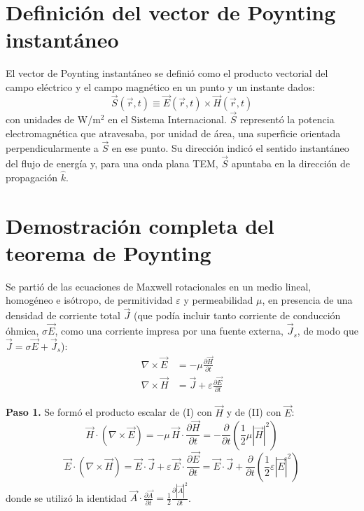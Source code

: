 \section{Definición del vector de Poynting instantáneo}
El vector de Poynting instantáneo se definió como el producto vectorial del campo eléctrico y el campo magnético en un punto y un instante dados:
\begin{equation}
    \vec{S}(\vec{r}, t) \equiv \vec{E}(\vec{r}, t)\times\vec{H}(\vec{r}, t)
\end{equation}
con unidades de W/m$^2$ en el Sistema Internacional. $\vec{S}$ representó la potencia electromagnética que atravesaba, por unidad de área, una superficie orientada perpendicularmente a $\vec{S}$ en ese punto. Su dirección indicó el sentido instantáneo del flujo de energía y, para una onda plana TEM, $\vec{S}$ apuntaba en la dirección de propagación $\hat{k}$.

\section{Demostración completa del teorema de Poynting}
Se partió de las ecuaciones de Maxwell rotacionales en un medio lineal, homogéneo e isótropo, de permitividad $\varepsilon$ y permeabilidad $\mu$, en presencia de una densidad de corriente total $\vec{J}$ (que podía incluir tanto corriente de conducción óhmica, $\sigma\vec{E}$, como una corriente impresa por una fuente externa, $\vec{J}_s$, de modo que $\vec{J}=\sigma\vec{E}+\vec{J}_s$):
\begin{align}
    \nabla\times\vec{E} &= -\mu\frac{\partial\vec{H}}{\partial t} \tag{I} \\
    \nabla\times\vec{H} &= \vec{J} + \varepsilon\frac{\partial\vec{E}}{\partial t} \tag{II}
\end{align}

\textbf{Paso 1.} Se formó el producto escalar de (I) con $\vec{H}$ y de (II) con $\vec{E}$:
\begin{equation}
    \vec{H}\cdot(\nabla\times\vec{E}) = -\mu\, \vec{H}\cdot\frac{\partial\vec{H}}{\partial t} = -\frac{\partial}{\partial t}\left(\frac{1}{2}\mu|\vec{H}|^2\right)
\end{equation}
\begin{equation}
    \vec{E}\cdot(\nabla\times\vec{H}) = \vec{E}\cdot\vec{J} + \varepsilon\, \vec{E}\cdot\frac{\partial\vec{E}}{\partial t} = \vec{E}\cdot\vec{J} + \frac{\partial}{\partial t}\left(\frac{1}{2}\varepsilon|\vec{E}|^2\right)
\end{equation}
donde se utilizó la identidad $\vec{A}\cdot\frac{\partial\vec{A}}{\partial t} = \frac{1}{2}\frac{\partial|\vec{A}|^2}{\partial t}$.

